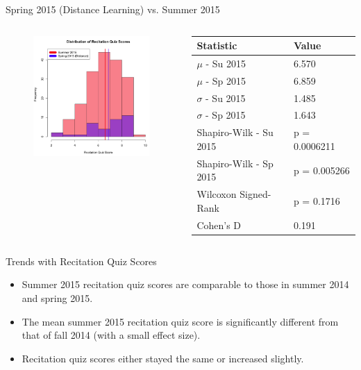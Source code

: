 \documentclass{beamer}
\begin{document}
\begin{frame}{Spring 2015 (Distance Learning) vs. Summer 2015}
\begin{columns}
\begin{column}{2in}
\begin{figure}
	\includegraphics[width=2in]{img/chapter4/rq_su15_vs_sp15d}
\end{figure}
\end{column}
\begin{column}{2in}
\begin{scriptsize}
\begin{table}
  \begin{tabular}{|l|l|}
    \hline
    \textbf{Statistic} & \textbf{Value} \\
	\hline
	$\mu$ - Su 2015 & 6.570 \\
	\hline
	$\mu$ - Sp 2015 & 6.859 \\
	\hline
	$\sigma$ - Su 2015 & 1.485 \\
	\hline
	$\sigma$ - Sp 2015 & 1.643 \\
	\hline
	Shapiro-Wilk - Su 2015 & p = 0.0006211 \\
	\hline
	Shapiro-Wilk - Sp 2015 & p = 0.005266 \\
	\hline
	Wilcoxon Signed-Rank & p = 0.1716 \\
	\hline
	Cohen's D & 0.191 \\
	\hline
  \end{tabular}
\end{table}
\end{scriptsize}
\end{column}
\end{columns}
\end{frame}

\begin{frame}{Trends with Recitation Quiz Scores}
  \begin{itemize}
    \item Summer 2015 recitation quiz scores are comparable to those in summer 2014 and spring 2015.
    \item The mean summer 2015 recitation quiz score is significantly different from that of fall 2014 (with a small effect size).
    \item Recitation quiz scores either stayed the same or increased slightly.
  \end{itemize}
\end{frame}
\end{document}

